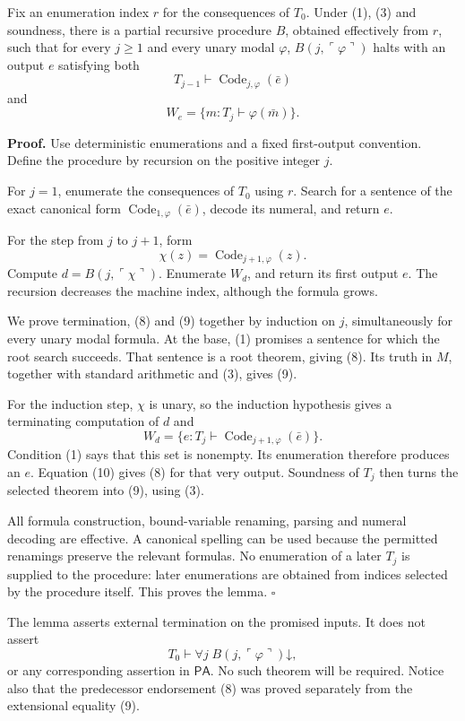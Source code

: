 \documentclass[
  11pt,
  letterpaper,
]{article}
\begin{document}
Fix an enumeration index \(r\) for the consequences of \(T_0\). Under
(1), (3) and soundness, there is a partial recursive procedure \(B\),
obtained effectively from \(r\), such that for every \(j\geq1\) and
every unary modal \(\varphi\), \(B(j,\ulcorner\varphi\urcorner)\) halts
with an output \(e\) satisfying both \[
T_{j-1}\vdash\operatorname{Code}_{j,\varphi}(\bar e)
\tag{8}
\] and \[
W_e=\{m:T_j\vdash\varphi(\bar m)\}.
\tag{9}
\]

\textbf{Proof.} Use deterministic enumerations and a fixed first-output
convention. Define the procedure by recursion on the positive integer
\(j\).

For \(j=1\), enumerate the consequences of \(T_0\) using \(r\). Search
for a sentence of the exact canonical form
\(\operatorname{Code}_{1,\varphi}(\bar e)\), decode its numeral, and
return \(e\).

For the step from \(j\) to \(j+1\), form \[
\chi(z)=\operatorname{Code}_{j+1,\varphi}(z).
\] Compute \(d=B(j,\ulcorner\chi\urcorner)\). Enumerate \(W_d\), and
return its first output \(e\). The recursion decreases the machine
index, although the formula grows.

We prove termination, (8) and (9) together by induction on \(j\),
simultaneously for every unary modal formula. At the base, (1) promises
a sentence for which the root search succeeds. That sentence is a root
theorem, giving (8). Its truth in \(M\), together with standard
arithmetic and (3), gives (9).

For the induction step, \(\chi\) is unary, so the induction hypothesis
gives a terminating computation of \(d\) and \[
W_d=\{e:T_j\vdash\operatorname{Code}_{j+1,\varphi}(\bar e)\}.
\tag{10}
\] Condition (1) says that this set is nonempty. Its enumeration
therefore produces an \(e\). Equation (10) gives (8) for that very
output. Soundness of \(T_j\) then turns the selected theorem into (9),
using (3).

All formula construction, bound-variable renaming, parsing and numeral
decoding are effective. A canonical spelling can be used because the
permitted renamings preserve the relevant formulas. No enumeration of a
later \(T_j\) is supplied to the procedure: later enumerations are
obtained from indices selected by the procedure itself. This proves the
lemma. \hfill\(\square\)

The lemma asserts external termination on the promised inputs. It does
not assert \[
T_0\vdash\forall j\;B(j,\ulcorner\varphi\urcorner)\mathord\downarrow,
\] or any corresponding assertion in \(\mathsf{PA}\). No such theorem
will be required. Notice also that the predecessor endorsement (8) was
proved separately from the extensional equality (9).
\end{document}
